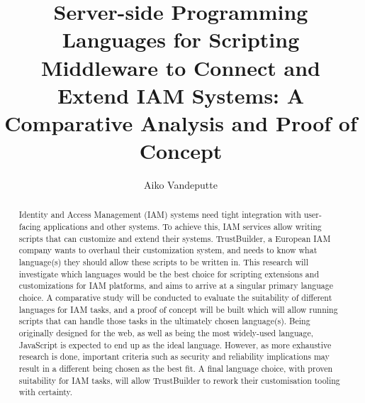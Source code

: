 \documentclass[english]{hogent-article}
\title{Server-side Programming Languages for Scripting Middleware to Connect and Extend IAM Systems: A Comparative Analysis and Proof of Concept}
\author{Aiko Vandeputte}
\begin{document}
\begin{abstract}
  Identity and Access Management (IAM) systems need tight integration with user-facing applications and other systems. To achieve this, IAM services allow writing scripts that can customize and extend their systems. TrustBuilder, a European IAM company wants to overhaul their customization system, and needs to know what language(s) they should allow these scripts to be written in. This research will investigate which languages would be the best choice for scripting extensions and customizations for IAM platforms, and aims to arrive at a singular primary language choice. A comparative study will be conducted to evaluate the suitability of different languages for IAM tasks, and a proof of concept will be built which will allow running scripts that can handle those tasks in the ultimately chosen language(s). Being originally designed for the web, as well as being the most widely-used language, JavaScript is expected to end up as the ideal language. However, as more exhaustive research is done, important criteria such as security and reliability implications may result in a different being chosen as the best fit. A final language choice, with proven suitability for IAM tasks, will allow TrustBuilder to rework their customisation tooling with certainty.
\end{abstract}

\tableofcontents



\printbibliography[heading=bibintoc]
\end{document}

